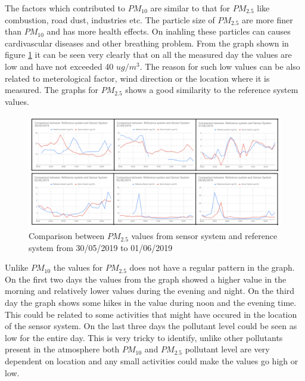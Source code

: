 The factors which contributed to $PM_{10}$ are similar to that for $PM_{2.5}$ like combustion, road dust, industries etc. The particle size of $PM_{2.5}$ are more finer than $PM_{10}$ and has more health effects. On inahling these particles can causes cardivascular diseases and other breathing problem. From the graph shown in figure \ref{PM2.5} it can be seen very clearly that on all the measured day the values are low and have not exceeded 40 $ug/m^3$. The reason for such low values can be also related to meterological factor, wind direction or the location where it is measured. The graphs for $PM_{2.5}$ shows a good similarity to the reference system values.



\begin{figure}[h]
  \begin{center}
  \includegraphics[scale=0.70]{images/figure27.png}
  \end{center}
  \caption{Comparison between $PM_{2.5}$ values from sensor system and reference system from 30/05/2019 to 01/06/2019}
\label{PM2.5}
\end{figure}

Unlike $PM_{10}$  the values for $PM_{2.5}$ does not have a regular pattern in the graph. On the first two days the values from the graph showed a higher value in the morning and relatively lower values during the evening and night. On the third day the graph shows some hikes in the value during noon and the evening time. This could be related to some activities that might have occured in the location of the sensor system. On the last three days the pollutant level could be seen as low for the entire day. This is very tricky to identify, unlike other pollutants present in the atmosphere both $PM_{10}$  and $PM_{2.5}$ pollutant level are very dependent on location and any small activities could make the values go high or low.


